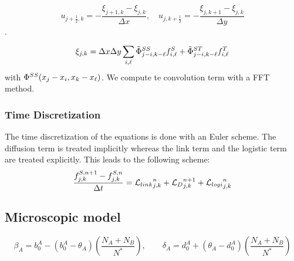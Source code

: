 $$u_{j+\frac{1}{2},k}=-\frac{\xi_{j+1,k}-\xi_{j,k}}{\Delta x}, \quad u_{j,k+\frac{1}{2}}=-\frac{\xi_{j,k+1}-\xi_{j,k}}{\Delta y}$$.


$$ \xi_{j,k}=\Delta x \Delta y \sum_{i,{\ell}} \tilde{\Phi}^{SS}_{j-i,k-{\ell}} f^{S}_{i,{\ell}}+
\tilde{\Phi}^{ST}_{j-i,k-{\ell}} f^{T}_{i,{\ell}} $$
with ${\Phi}^{SS}(x_j-x_i,x_k-x_{{\ell}})$. We compute te convolution term with a FFT method.
% 


\subsubsection{Time Discretization}

The time discretization of the equations is done with an Euler scheme. The diffusion term is treated implicitly whereas the link term and the logistic term are treated explicitly. This leads to the following scheme:
\begin{equation}
	\frac{f_{j,k}^{S,n+1}-f_{j,k}^{S,n}}{\Delta t}={\mathcal{L}_{link}}_{j,k}^n+{\mathcal{L}_{D}}_{j,k}^{n+1}+{\mathcal{L}_{logi}}_{j,k}^n
\end{equation}
\subsection{Microscopic model}

\begin{equation}
\beta_{A}=b_{0}^{A}-(b_{0}^{A}-\theta_{A})\left(\frac{N_A+N_B}{N^{*}}\right), \quad\quad \delta_{A}=d_{0}^{A}+(\theta_{A}-d_{0}^{A})\left(\frac{N_A+N_B}{N^{*}}\right)
\end{equation}

